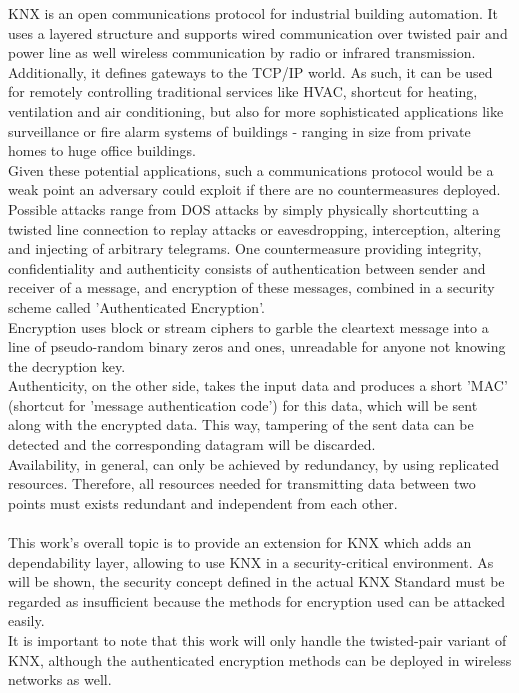 \documentclass[a4paper,12pt,twoside]{memoir}
\begin{document}
KNX is an open communications protocol for industrial building automation.
It uses a layered structure and supports wired communication over twisted pair
and power line as well wireless communication by radio or infrared transmission. 
Additionally, it defines gateways to the TCP/IP world. 
As such, it can be used for remotely controlling traditional services like HVAC, shortcut
for heating, ventilation and air conditioning, but also for more sophisticated applications\cite{knxapps}
like surveillance or fire alarm systems of buildings - ranging in size
from private homes to huge office buildings.
\\
Given these potential applications, such a communications protocol would be a weak point an adversary
could exploit if there are no countermeasures deployed.
Possible attacks range from DOS attacks by simply physically shortcutting a twisted line
connection to replay attacks or eavesdropping, interception, altering and injecting of arbitrary telegrams.
One countermeasure providing integrity, confidentiality and authenticity consists of authentication
between sender and receiver of a message, and encryption of these messages, combined in a security scheme
called 'Authenticated Encryption'.
\\
Encryption uses block or stream ciphers to garble the cleartext message into a line of pseudo-random binary
zeros and ones, unreadable for anyone not knowing the decryption key.
\\
Authenticity, on the other side, takes the input data and produces a short 'MAC'
(shortcut for 'message authentication code')
for this data, which will be sent along with the encrypted data. This way, tampering of the sent data can be
detected and the corresponding datagram will be discarded.
\\
Availability, in general, can only be achieved by redundancy, by using replicated resources. Therefore, all
resources needed for transmitting data between two points must exists redundant and independent from 
each other.
\\
\\
This work's overall topic is to provide an extension for KNX which adds an dependability layer, allowing 
to use KNX in a security-critical environment. As will be shown, the security concept defined in the
actual KNX Standard must be regarded as insufficient because the methods for encryption used can be attacked
easily.
\\
It is important to note that this work will only
handle the twisted-pair variant of KNX, although the authenticated encryption methods can be deployed in
wireless networks as well.
\end{document}

